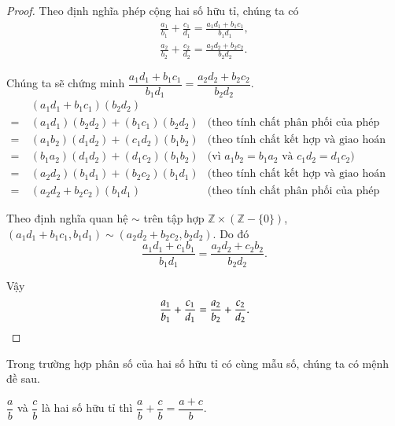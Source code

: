 \begin{proof}
    Theo định nghĩa phép cộng hai số hữu tỉ, chúng ta có
    \[
        \begin{split}
            \frac{a_{1}}{b_{1}} + \frac{c_{1}}{d_{1}} = \frac{a_{1} d_{1} + b_{1} c_{1}}{b_{1} d_{1}}, \\
            \frac{a_{2}}{b_{2}} + \frac{c_{2}}{d_{2}} = \frac{a_{2} d_{2} + b_{2} c_{2}}{b_{2} d_{2}}.
        \end{split}
    \]

    Chúng ta sẽ chứng minh $\dfrac{a_{1} d_{1} + b_{1} c_{1}}{b_{1} d_{1}} = \dfrac{a_{2} d_{2} + b_{2} c_{2}}{b_{2} d_{2}}$.
    \begin{align*}
            & (a_{1} d_{1} + b_{1} c_{1}) (b_{2} d_{2})                                                                                           \\
        =\  & (a_{1} d_{1}) (b_{2} d_{2}) + (b_{1} c_{1}) (b_{2} d_{2}) & \text{(theo tính chất phân phối của phép nhân với phép cộng số nguyên)} \\
        =\  & (a_{1} b_{2}) (d_{1} d_{2}) + (c_{1} d_{2}) (b_{1} b_{2}) & \text{(theo tính chất kết hợp và giao hoán của phép nhân số nguyên)}    \\
        =\  & (b_{1} a_{2}) (d_{1} d_{2}) + (d_{1} c_{2}) (b_{1} b_{2}) & \text{(vì $a_{1} b_{2} = b_{1} a_{2}$ và $c_{1} d_{2} = d_{1} c_{2}$)}  \\
        =\  & (a_{2} d_{2}) (b_{1} d_{1}) + (b_{2} c_{2}) (b_{1} d_{1}) & \text{(theo tính chất kết hợp và giao hoán của phép nhân số nguyên)}    \\
        =\  & (a_{2} d_{2} + b_{2} c_{2}) (b_{1} d_{1})                 & \text{(theo tính chất phân phối của phép nhân với phép cộng số nguyên)}
    \end{align*}

    Theo định nghĩa quan hệ $\sim$ trên tập hợp $\mathbb{Z}\times(\mathbb{Z} - \{0\})$, $(a_{1} d_{1} + b_{1} c_{1}, b_{1} d_{1}) \sim (a_{2} d_{2} + b_{2} c_{2}, b_{2} d_{2})$. Do đó
    \[
        \frac{a_{1} d_{1} + c_{1} b_{1}}{b_{1} d_{1}} = \frac{a_{2} d_{2} + c_{2} b_{2}}{b_{2} d_{2}}.
    \]

    Vậy
    \[
        \frac{a_{1}}{b_{1}} + \frac{c_{1}}{d_{1}} = \frac{a_{2}}{b_{2}} + \frac{c_{2}}{d_{2}}.\qedhere
    \]
\end{proof}

Trong trường hợp phân số của hai số hữu tỉ có cùng mẫu số, chúng ta có mệnh đề sau.
\begin{theorem}\label{theorem:same-denominator}
    $\dfrac{a}{b}$ và $\dfrac{c}{b}$ là hai số hữu tỉ thì $\dfrac{a}{b} + \dfrac{c}{b} = \dfrac{a + c}{b}$.
\end{theorem}

